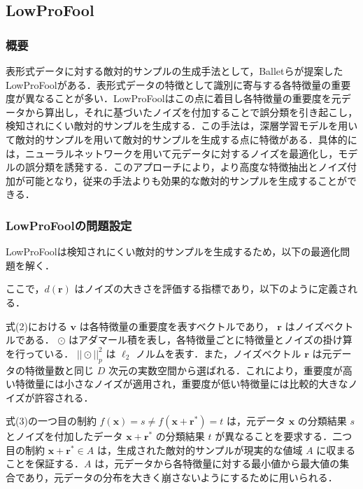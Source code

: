 \subsection{LowProFool}
\subsubsection{概要}
表形式データに対する敵対的サンプルの生成手法として，Balletらが提案したLowProFool\cite{ballet2019imperceptible}がある．表形式データの特徴として識別に寄与する各特徴量の重要度が異なることが多い．LowProFoolはこの点に着目し各特徴量の重要度を元データから算出し，それに基づいたノイズを付加することで誤分類を引き起こし，検知されにくい敵対的サンプルを生成する．この手法は，深層学習モデルを用いて敵対的サンプルを用いて敵対的サンプルを生成する点に特徴がある．具体的には，ニューラルネットワークを用いて元データに対するノイズを最適化し，モデルの誤分類を誘発する．このアプローチにより，より高度な特徴抽出とノイズ付加が可能となり，従来の手法よりも効果的な敵対的サンプルを生成することができる．

\subsubsection{LowProFoolの問題設定}
LowProFoolは検知されにくい敵対的サンプルを生成するため，以下の最適化問題を解く．

ここで，$d(\bm{r})$ はノイズの大きさを評価する指標であり，以下のように定義される．

式(2)における $\bm{v}$ は各特徴量の重要度を表すベクトルであり， $\bm{r}$ はノイズベクトルである． $\odot$ はアダマール積を表し，各特徴量ごとに特徴量とノイズの掛け算を行っている． $||\odot||^2_p$ は $\ell_2$ ノルムを表す．また，ノイズベクトル $\bm{r}$ は元データの特徴量数と同じ $D$ 次元の実数空間から選ばれる．これにより，重要度が高い特徴量には小さなノイズが適用され，重要度が低い特徴量には比較的大きなノイズが許容される．

式(3)の一つ目の制約 $f(\bm{x}) = s \neq f(\bm{x}+\bm{r}^*) = t$ は，元データ $\bm{x}$ の分類結果 $s$ とノイズを付加したデータ $\bm{x}+\bm{r}^*$ の分類結果 $t$ が異なることを要求する．二つ目の制約 $\bm{x}+\bm{r}^* \in A$ は，生成された敵対的サンプルが現実的な値域 $A$ に収まることを保証する．$A$ は，元データから各特徴量に対する最小値から最大値の集合であり，元データの分布を大きく崩さないようにするために用いられる．

